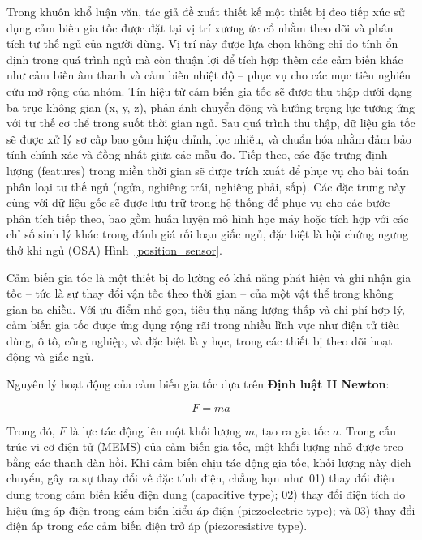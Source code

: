 Trong khuôn khổ luận văn, tác giả đề xuất thiết kế một thiết bị đeo 
tiếp xúc sử dụng cảm biến gia tốc được đặt tại vị trí xương ức cổ 
nhằm theo dõi và phân tích tư thế ngủ của người dùng. 
Vị trí này được lựa chọn không chỉ do tính ổn định trong 
quá trình ngủ mà còn thuận lợi để tích hợp thêm các cảm biến 
khác như cảm biến âm thanh và cảm biến nhiệt độ – phục vụ cho các mục tiêu nghiên 
cứu mở rộng của nhóm. Tín hiệu từ cảm biến gia tốc sẽ được 
thu thập dưới dạng ba trục không gian (x, y, z), phản ánh chuyển động và 
hướng trọng lực tương ứng với tư thế cơ thể trong suốt thời gian ngủ. 
Sau quá trình thu thập, dữ liệu gia tốc sẽ được xử lý sơ cấp bao gồm hiệu chỉnh, 
lọc nhiễu, và chuẩn hóa nhằm đảm bảo tính chính xác và đồng nhất giữa các mẫu đo. 
Tiếp theo, các đặc trưng định lượng (features) trong miền thời gian 
sẽ được trích xuất để phục vụ cho bài toán phân loại tư thế ngủ (ngửa, nghiêng trái, nghiêng phải, sấp). 
Các đặc trưng này cùng với dữ liệu gốc sẽ được lưu trữ trong hệ thống để phục vụ cho các bước phân tích tiếp theo, 
bao gồm huấn luyện mô hình học máy hoặc tích hợp với các chỉ số sinh lý khác trong đánh giá rối loạn giấc ngủ, 
đặc biệt là hội chứng ngưng thở khi ngủ (OSA) Hình~\ref{position_sensor}.

Cảm biến gia tốc là một thiết bị đo lường có khả năng phát hiện 
và ghi nhận gia tốc – tức là sự thay đổi vận tốc theo thời gian – 
của một vật thể trong không gian ba chiều. 
Với ưu điểm nhỏ gọn, tiêu thụ năng lượng thấp và chi phí hợp lý, 
cảm biến gia tốc được ứng dụng rộng rãi trong nhiều lĩnh vực 
như điện tử tiêu dùng, ô tô, công nghiệp, và đặc biệt là y học, 
trong các thiết bị theo dõi hoạt động và giấc ngủ.

Nguyên lý hoạt động của cảm biến gia tốc dựa trên 
\textbf{Định luật II Newton}:

\begin{equation}
F = ma
\end{equation}

Trong đó, $F$ là lực tác động lên một khối lượng $m$, tạo ra gia tốc $a$. Trong cấu trúc vi cơ điện tử (MEMS) của cảm biến gia tốc, một khối lượng nhỏ được treo bằng các thanh đàn hồi. Khi cảm biến chịu tác động gia tốc, khối lượng này dịch chuyển, gây ra sự thay đổi về đặc tính điện, chẳng hạn như: 01) thay đổi điện dung trong cảm biến kiểu điện dung (capacitive type); 02) thay đổi điện tích do hiệu ứng áp điện trong cảm biến kiểu áp điện (piezoelectric type); và 03) thay đổi điện áp trong các cảm biến điện trở áp (piezoresistive type).

